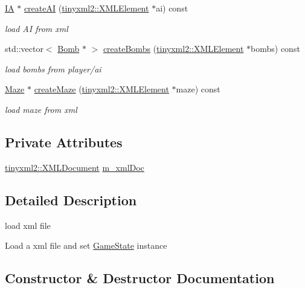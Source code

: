 \begin{DoxyCompactItemize}
\hyperlink{class_i_a}{I\+A} $\ast$ \hyperlink{class_xml_load_a3583a4d484965ecdb8625b8c267518c1}{create\+A\+I} (\hyperlink{classtinyxml2_1_1_x_m_l_element}{tinyxml2\+::\+X\+M\+L\+Element} $\ast$ai) const 
\begin{DoxyCompactList}\small\item\em load A\+I from xml \end{DoxyCompactList}\item 
std\+::vector$<$ \hyperlink{class_bomb}{Bomb} $\ast$ $>$ \hyperlink{class_xml_load_a94455fad3586a8cacadaec35ba743c1e}{create\+Bombs} (\hyperlink{classtinyxml2_1_1_x_m_l_element}{tinyxml2\+::\+X\+M\+L\+Element} $\ast$bombs) const 
\begin{DoxyCompactList}\small\item\em load bombs from player/ai \end{DoxyCompactList}\item 
\hyperlink{class_maze}{Maze} $\ast$ \hyperlink{class_xml_load_aaec79171f5c07ef19df2ed4d7cc61499}{create\+Maze} (\hyperlink{classtinyxml2_1_1_x_m_l_element}{tinyxml2\+::\+X\+M\+L\+Element} $\ast$maze) const 
\begin{DoxyCompactList}\small\item\em load maze from xml \end{DoxyCompactList}\end{DoxyCompactItemize}
\subsection*{Private Attributes}
\begin{DoxyCompactItemize}
\item 
\hyperlink{classtinyxml2_1_1_x_m_l_document}{tinyxml2\+::\+X\+M\+L\+Document} \hyperlink{class_xml_load_acef322779a50e79c11c783444d38778e}{m\+\_\+xml\+Doc}
\end{DoxyCompactItemize}


\subsection{Detailed Description}
load xml file 

Load a xml file and set \hyperlink{class_game_state}{Game\+State} instance 

\subsection{Constructor \& Destructor Documentation}
\hypertarget{class_xml_load_aaf07a6622c712880f951c11c9f40c133}{}
